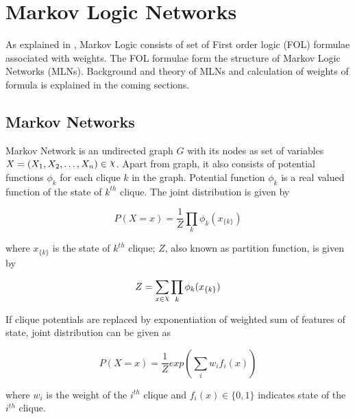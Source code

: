 \chapter{Markov Logic Networks}

\label{ch4_MLN}


As explained in \cite{MarkovLogic}, Markov Logic consists of set of First order
logic (FOL) formulae associated with weights. The FOL formulae form the structure 
of Markov Logic Networks (MLNs). Background and theory of MLNs and calculation of
weights of formula is explained in the coming sections.

\section{Markov Networks}
Markov Network is an undirected graph $G$ with its nodes as set of variables $X = (X_1, X_2,\ldots, X_n) \in \rchi $.
Apart from graph, it also consists of potential functions $\phi_k$ for each clique $k$ in the graph.
Potential function $\phi_k$ is a real valued function of the state of $k^{th}$ clique.
The joint distribution is given by

\begin{equation}
	\label{jointDist}
	P(X = x) = \frac{1}{Z}{\displaystyle \prod_{k} \phi_{k}(x_{\{k\}})}
\end{equation}

where $x_{\{k\}}$ is the state of $k^{th}$ clique;
$Z$, also known as partition function, is given by

\begin{equation}
	\label{partitionFunc}
	Z = \displaystyle \sum_{x \in \rchi} \displaystyle \prod_{k} \phi_k(x_{\{k\}}) 
\end{equation}

If clique potentials are replaced by exponentiation of weighted sum of features of state,
joint distribution can be given as

\begin{equation}
	\label{jointDistWeighted}
	P(X = x) = \frac{1}{Z} exp \left( \displaystyle \sum_i w_i f_i(x) \right)
\end{equation}

where $w_i$ is the weight of the $i^{th}$ clique and $f_i(x) \in \{0,1\}$ indicates state 
of the $i^{th}$ clique.

